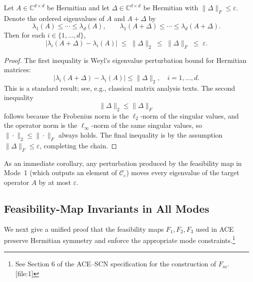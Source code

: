 \documentclass[11pt]{article}
\begin{document}
\begin{lemma}\label{lem:weyl-frob}
Let \( A \in \mathbb{C}^{d\times d} \) be Hermitian and let \( \Delta \in \mathbb{C}^{d\times d} \) be Hermitian with \( \|\Delta\|_F \le \varepsilon \). Denote the ordered eigenvalues of \( A \) and \( A+\Delta \) by
\[
\lambda_1(A) \le \cdots \le \lambda_d(A), \qquad
\lambda_1(A+\Delta) \le \cdots \le \lambda_d(A+\Delta).
\]
Then for each \( i \in \{1,\dots,d\} \),
\[
|\lambda_i(A+\Delta) - \lambda_i(A)| \;\le\; \|\Delta\|_2 \;\le\; \|\Delta\|_F \;\le\; \varepsilon.
\]
\end{lemma}

\begin{proof}
The first inequality is Weyl's eigenvalue perturbation bound for Hermitian matrices:
\[
|\lambda_i(A+\Delta) - \lambda_i(A)| \le \|\Delta\|_2, \quad i=1,\dots,d.
\]
This is a standard result; see, e.g., classical matrix analysis texts. The second inequality
\[
\|\Delta\|_2 \le \|\Delta\|_F
\]
follows because the Frobenius norm is the \( \ell_2 \)-norm of the singular values, and the operator norm is the \( \ell_\infty \)-norm of the same singular values, so \( \|\cdot\|_2 \le \|\cdot\|_F \) always holds. The final inequality is by the assumption \( \|\Delta\|_F \le \varepsilon \), completing the chain.
\end{proof}

As an immediate corollary, any perturbation produced by the feasibility map in Mode~1 (which outputs an element of \( \mathcal{C}_\varepsilon \)) moves every eigenvalue of the target operator \( A \) by at most \( \varepsilon \).

\subsection{Feasibility-Map Invariants in All Modes}

We next give a unified proof that the feasibility maps \( F_1, F_2, F_3 \) used in ACE preserve Hermitian symmetry and enforce the appropriate mode constraints.\footnote{See Section 6 of the ACE--SCN specification for the construction of \( F_m \). [file:1]}
\end{document}
